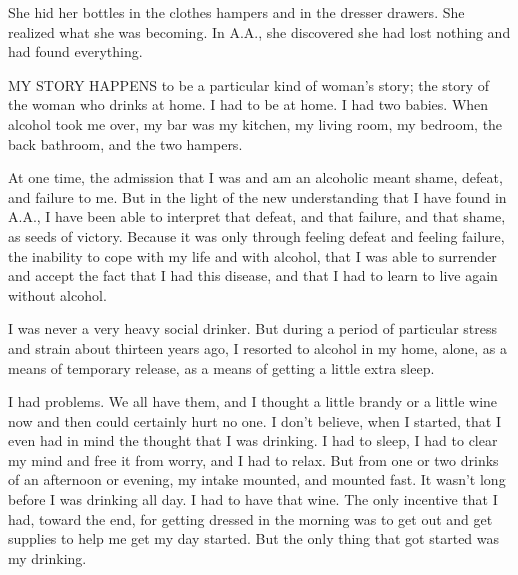 

\bbChapterPreamble




\begin{biblechapter}
    She hid her bottles in the clothes hampers 
    and in the dresser drawers.
She realized what she was becoming.
In A.A., she discovered she had lost nothing
    and had found everything.
\end{biblechapter}


\begin{biblechapter}
    MY STORY HAPPENS to be a particular kind of woman’s story; 
    the story of the woman who drinks at home.
\verse I had to be at home.
\verse I had two babies.
\verse When alcohol took me over, 
    my bar was my kitchen, 
    my living room, my bedroom, 
    the back bathroom, and the two hampers.

\verse At one time, the admission that I was and am an alcoholic meant shame, defeat, and failure to me. But in the light of the new understanding that I have found in A.A., I have been able to interpret that defeat, and that failure, and that shame, as seeds of victory. Because it was only through feeling defeat and feeling failure, the inability to cope with my life and with alcohol, that I was able to surrender and accept the fact that I had this disease, and that I had to learn to live again without alcohol.

I was never a very heavy social drinker. But during a period of particular stress and strain about thirteen years ago, I resorted to alcohol in my home, alone, as a means of temporary release, as a means of getting a little extra sleep.

       I had problems. We all have them, and I thought a little brandy or a little wine now and then could certainly hurt no one. I don’t believe, when I started, that I even had in mind the thought that I was drinking. I had to sleep, I had to clear my mind and free it from worry, and I had to relax. But from one or two drinks of an afternoon or evening, my intake mounted, and mounted fast. It wasn’t long before I was drinking all day. I had to have that wine. The only incentive that I had, toward the end, for getting dressed in the morning was to get out and get supplies to help me get my day started. But the only thing that got started was my drinking.


\end{biblechapter}
